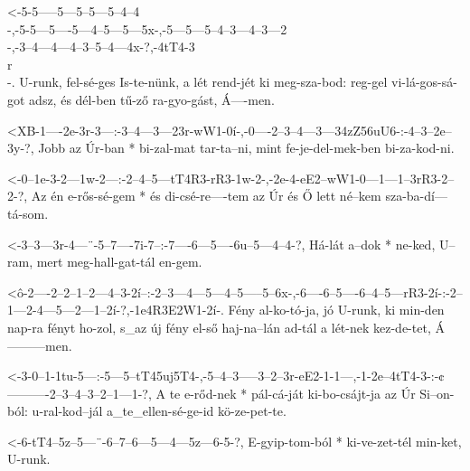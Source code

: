   {<-5-5-----5---5--5---5--4--4\\-,-5-5---5----5---4--5---5---5x-,-5---5---5--4--3---4--3---2\\-,-3--4---4---4--3--5--4---4x-?,-4tT4-3\\r\\-.}
  {  U-runk, fel-sé-ges Is-te-nünk, a lét rend-jét ki meg-sza-bod: reg-gel vi-lá-gos-sá-got adsz, és dél-ben tű-ző ra-gyo-gást, Á----men.}

  {<XB-1----2e-3r-3---:-3--4---3---23r-wW1-0í-,-0----2--3--4---3---34zZ56uU6-:-4--3--2e--3y-?,}
  {    Jobb az Úr-ban * bi-zal-mat tar-ta--ni,  mint fe-je-del-mek-ben         bi-za-kod-ni.}

  {<-0--1e-3-2---1w-2---:-2--4--5---tT4R3-rR3-1w-2-,-2e-4-eE2--wW1-0---1---1--3rR3-2--2-?,}
  {  Az én e-rős-sé-gem * és di-csé-re----tem az Úr  és Ő lett né--kem sza-ba-dí---tá-som.}

  {<-3--3---3r-4---¨-5--7----7i-7--:-7----6---5----6u--5---4--4-?,}
  {  Há-lát a--dok * ne-ked, U--ram, mert meg-hall-gat-tál en-gem.}


  {<ô-2----2--2--1--2---4--3-2í--:-2--3---4---5---4--5-----5--6x-,-6----6--5----6--4--5---rR3-2í-:-2--1---2-4---5---2---1--2í-?,-1e4R3E2W1-2í-.}
  {   Fény al-ko-tó-ja, jó U-runk, ki min-den nap-ra fényt ho-zol, s_az új fény el-ső haj-na--lán  ad-tál a lét-nek kez-de-tet, Á---------men.}

  {<-3-0--1-1tu-5---:-5---5--tT45uj5T4-,-5--4--3-----3--2--3r-eE2-1-1---,-1-2e--4tT4-3-:-¢----------2--3--4--3--2--1---1-?,}
  {  A te e-rőd-nek * pál-cá-ját         ki-bo-csájt-ja az Úr Si--on-ból: u-ral-kod--jál a_te_ellen-sé-ge-id kö-ze-pet-te.}

  {<-6-tT4--5z--5---¨-6--7--6---5---4---5z---6-5-?,}
  {  E-gyip-tom-ból * ki-ve-zet-tél min-ket, U-runk.}

